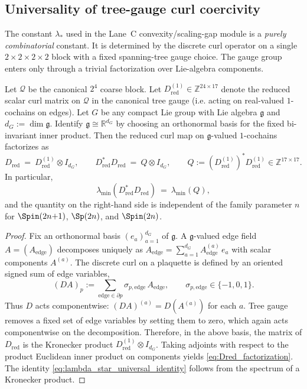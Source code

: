 \subsection{Universality of tree-gauge curl coercivity}
\label{app:lambda_star_universal}

The constant $\lambda_\ast$ used in the Lane~C convexity/scaling-gap module is a \emph{purely combinatorial} constant.
It is determined by the discrete curl operator on a single $2\times2\times2\times2$ block with a fixed spanning-tree gauge choice.
The gauge group enters only through a trivial factorization over Lie-algebra components.

\begin{lemma}
\label{lem:lambda_star_factorization}
Let $\mathcal Q$ be the canonical $2^4$ coarse block.
Let $D_{\mathrm{red}}^{(1)}\in\mathbb Z^{24\times 17}$ denote the reduced scalar curl matrix on $\mathcal Q$ in the canonical tree gauge
(i.e. acting on real-valued $1$-cochains on edges).
Let $G$ be any compact Lie group with Lie algebra $\mathfrak g$ and $d_G:=\dim\mathfrak g$.
Identify $\mathfrak g\cong\mathbb R^{d_G}$ by choosing an orthonormal basis for the fixed bi-invariant inner product.
Then the reduced curl map on $\mathfrak g$-valued $1$-cochains factorizes as
\begin{equation}
\label{eq:Dred_factorization}
D_{\mathrm{red}}\ =\ D_{\mathrm{red}}^{(1)}\otimes I_{d_G},
\qquad
D_{\mathrm{red}}^{\ast}D_{\mathrm{red}}\ =\ Q\otimes I_{d_G},
\qquad
Q:=(D_{\mathrm{red}}^{(1)})^{\ast}D_{\mathrm{red}}^{(1)}\in\mathbb Z^{17\times 17}.
\end{equation}
In particular,
\begin{equation}
\label{eq:lambda_star_universal_identity}
\lambda_{\min}(D_{\mathrm{red}}^{\ast}D_{\mathrm{red}})\ =\ \lambda_{\min}(Q),
\end{equation}
and the quantity on the right-hand side is independent of the family parameter $n$ for $\Spin(2n{+}1)$, $\Sp(2n)$, and $\Spin(2n)$.
\end{lemma}

\begin{proof}
Fix an orthonormal basis $(e_a)_{a=1}^{d_G}$ of $\mathfrak g$.
A $\mathfrak g$-valued edge field $A=(A_{\mathrm{edge}})$ decomposes uniquely as
$A_{\mathrm{edge}}=\sum_{a=1}^{d_G} A^{(a)}_{\mathrm{edge}}\,e_a$ with scalar components $A^{(a)}$.
The discrete curl on a plaquette is defined by an oriented signed sum of edge variables,
\[ (DA)_{p}:=\sum_{\mathrm{edge}\in\partial p}\sigma_{p,\mathrm{edge}}\,A_{\mathrm{edge}},\qquad \sigma_{p,\mathrm{edge}}\in\{-1,0,1\}. \]
Thus $D$ acts componentwise:
$(DA)^{(a)}=D(A^{(a)})$ for each $a$.
Tree gauge removes a fixed set of edge variables by setting them to zero, which again acts componentwise on the decomposition.
Therefore, in the above basis, the matrix of $D_{\mathrm{red}}$ is the Kronecker product $D_{\mathrm{red}}^{(1)}\otimes I_{d_G}$.
Taking adjoints with respect to the product Euclidean inner product on components yields \eqref{eq:Dred_factorization}.
The identity \eqref{eq:lambda_star_universal_identity} follows from the spectrum of a Kronecker product.
\end{proof}


